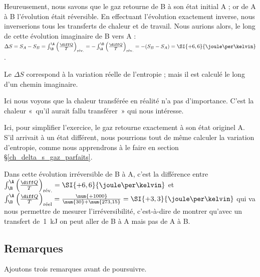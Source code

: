 \begin{anexample}
\begin{answer}
				Heureusement, nous savons que le gaz retourne de B à son état initial A ; or de A à B l’évolution était réversible. En effectuant l’évolution exactement inverse, nous inverserions tous les transferts de chaleur et de travail. Nous aurions alors, le long de cette évolution imaginaire de B vers A : $\Delta S = S_A - S_B
					= \int_\B^\A \left( \frac{\diff Q}{T} \right)_\text{rév.}
					= - \int_\A^\B \left( \frac{\diff Q}{T} \right)_\text{rév.}
					= -(S_B - S_A)
					= \SI{+6,6}{\joule\per\kelvin}$.
						\begin{remark}Le $\Delta S$ correspond à la variation réelle de l’entropie ; mais il est calculé le long d’un chemin imaginaire.\end{remark}
						\begin{remark} Ici nous voyons que la chaleur transférée en réalité n’a pas d’importance. C’est la chaleur «~qu’il aurait fallu transférer~» qui nous intéresse.\end{remark}
						\begin{remark} Ici, pour simplifier l’exercice, le gaz retourne exactement à son état originel A. S’il arrivait à un état différent, nous pourrions tout de même calculer la variation d’entropie, comme nous apprendrons à le faire en section \S\ref{ch_delta_s_gaz_parfaits}.\end{remark}
						\begin{remark}Dans cette évolution irréversible de B à A, c’est la différence entre $\int_\B^\A \left( \frac{\diff Q}{T} \right)_\text{rév.} = \SI{+6,6}{\joule\per\kelvin}$ et $\int_\B^\A \left( \frac{\diff Q}{T} \right)_\text{réel} = \frac{\num{+1000}}{\num{30}+\num{273,15}} =  \SI{+3,3}{\joule\per\kelvin}$ qui va nous permettre de mesurer l’irréversibilité, c’est-à-dire de montrer qu’avec un transfert de~\SI{1}{\kilo\joule} on peut aller de B à A mais pas de A à B.\end{remark}
				\end{answer}
		\end{anexample}

		
	\subsection{Remarques}
	
		Ajoutons trois remarques avant de poursuivre.
		
